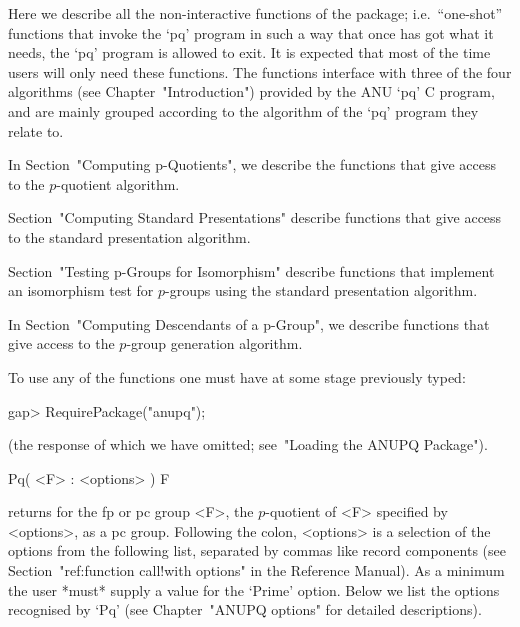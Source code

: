 

Here we describe  all  the  non-interactive  functions  of  the  {\ANUPQ}
package; i.e.~``one-shot'' functions that invoke the `pq' program in  such
a way that once {\GAP} has got what it needs, the `pq' program is  allowed
to exit. It is expected that most of the time users will only need  these
functions. The functions interface with three of the four algorithms (see
Chapter~"Introduction") provided by the  ANU  `pq'  C  program,  and  are
mainly grouped according to the algorithm of the `pq' program they  relate
to.

In Section~"Computing p-Quotients", we describe the functions  that  give
access to the $p$-quotient algorithm.

Section~"Computing Standard Presentations" describe functions  that  give
access to the standard presentation algorithm.

Section~"Testing  p-Groups  for  Isomorphism"  describe  functions   that
implement  an  isomorphism  test  for  $p$-groups  using   the   standard
presentation algorithm.

In Section~"Computing Descendants of a p-Group",  we  describe  functions
that give access to the $p$-group generation algorithm.

To use any of the functions one must have at some stage previously typed:

\begintt
gap> RequirePackage("anupq");
\endtt

(the response of which we have omitted; see~"Loading the ANUPQ Package").


\>Pq( <F> : <options> ) F

returns for the fp or pc group <F>, the $p$-quotient of <F> specified  by
<options>, as a pc group. Following the colon, <options> is  a  selection
of the options from the following list, separated by commas  like  record
components (see Section~"ref:function call!with options"  in  the  {\GAP}
Reference Manual). As a minimum the user *must* supply a  value  for  the
`Prime' option. Below  we  list  the  options  recognised  by  `Pq'  (see
Chapter~"ANUPQ options" for detailed descriptions).

